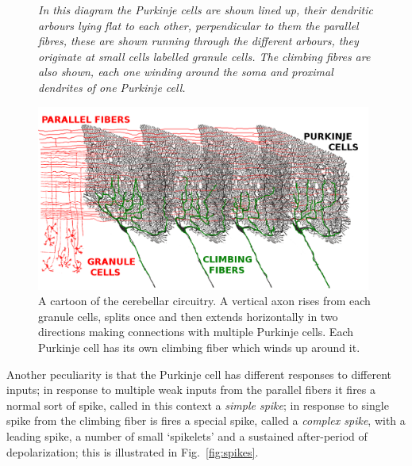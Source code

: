 \documentclass[12pt]{article}
\begin{document}
\begin{figure}
   {{\textsl{In this diagram the Purkinje
        cells are shown lined up, their dendritic arbours lying flat
        to each other, perpendicular to them the parallel fibres,
        these are shown running through the different arbours, they originate at small cells labelled granule cells. The climbing fibres are also shown, each one winding around the soma and proximal dendrites of one Purkinje cell.}}}
  {
  \begin{center}
    \includegraphics[width=11cm]{cerebellum.png}
  \end{center}
  }
\caption{A cartoon of the cerebellar circuitry. A vertical axon rises
  from each granule cells, splits once and then extends horizontally
  in two directions making connections with multiple Purkinje
  cells. Each Purkinje cell has its own climbing fiber which winds up
  around it.\label{fig:cerebellum}}
\end{figure}

Another peculiarity is that the Purkinje cell has different responses
to different inputs; in response to multiple weak inputs from the
parallel fibers it fires a normal sort of spike, called in this
context a \textsl{simple spike}; in response to single spike from the
climbing fiber is fires a special spike, called a \textsl{complex
  spike}, with a leading spike, a number of small \lq{}spikelets\rq{}
and a sustained after-period of depolarization; this is illustrated in
Fig.~\ref{fig:spikes}.
\end{document}
